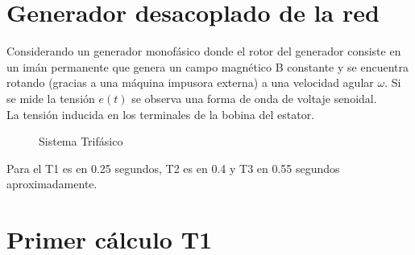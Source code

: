 \documentclass[]{article}
\begin{document}
\section{Generador desacoplado de la red}

Considerando un generador monofásico donde el rotor del generador consiste en un imán permanente que genera un campo magnético B constante y se encuentra rotando (gracias a una máquina impusora externa)  a una velocidad agular $\omega$. Si se mide la tensión $e(t)$ se observa una forma de onda de voltaje senoidal.\\

La tensión inducida en los terminales de la bobina del estator.\\







\begin{figure}[h!]
	\centering
	
	\caption{Sistema Trifásico}
	\label{sitemaTrifasico}
\end{figure}


Para el T1 es en 0.25 segundos, T2 es en 0.4 y T3 en 0.55$  $ segundos aproximadamente.\\

\section{Primer cálculo T1}
\end{document}
